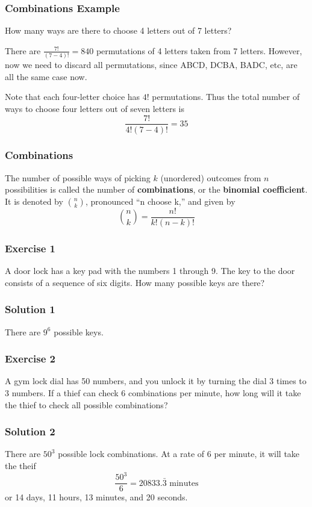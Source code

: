 \documentclass{beamer}
\newcommand{\<}{\langle}
\renewcommand{\>}{\rangle}
\begin{document}
\begin{frame}
\frametitle{Combinations Example}

How many ways are there to choose 4 letters out of 7 letters? \newline

\pause

There are $\frac{7!}{(7-4)!} = 840$ permutations of 4 letters taken from 7 letters. However, now we need to discard all permutations, since ABCD, DCBA, BADC, etc, are all the same case now. \newline

\pause

Note that each four-letter choice has $4!$ permutations. Thus the total number of ways to choose four letters out of seven letters is 
\[
\frac{7!}{4!(7-4)!} = 35
\]
\end{frame}




\begin{frame}
\frametitle{Combinations}

The number of possible ways of picking $k$ (unordered) outcomes from $n$ possibilities is called the number of \textbf{combinations}, or the \textbf{binomial coefficient}. It is denoted by $n\choose k$, pronounced ``n choose k,'' and given by 
\[
{n \choose k} = \frac{n!}{k!(n-k)!}
\]
\end{frame}

\begin{frame}
\frametitle{Exercise 1}

A door lock has a key pad with the numbers 1 through 9. The key to the door consists of a sequence of six digits. How many possible keys are there?
\end{frame}

\begin{frame}
\frametitle{Solution 1}

There are $9^6$ possible keys.
\end{frame}

\begin{frame}
\frametitle{Exercise 2}

A gym lock dial has 50 numbers, and you unlock it by turning the dial 3 times to 3 numbers. If a thief can check 6 combinations per minute, how long will it take the thief to check all possible combinations?
\end{frame}

\begin{frame}
\frametitle{Solution 2}

There are $50^3$ possible lock combinations. At a rate of 6 per minute, it will take the theif 
\[
\frac{50^3}{6} = 20833.\bar{3} \text{ minutes}
\]
or 14 days, 11 hours, 13 minutes, and 20 seconds.
\end{frame}
\end{document}
